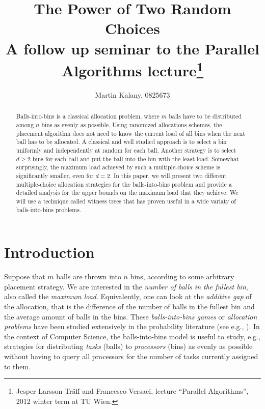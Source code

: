 \documentclass[a4paper,12pt]{article}
\begin{document}
\title{The Power of Two Random Choices\\ 
\large A follow up seminar to the Parallel Algorithms lecture\footnote{Jesper Larsson Tr\"aff and Francesco Versaci, lecture ``Parallel Algorithms'', 2012 winter term at TU Wien.}}
\author{Martin Kalany, 0825673}

\maketitle
\begin{abstract}
Balls-into-bins is a classical allocation problem, where $m$ balls have to be distributed among $n$ bins as evenly as possible. Using ranomized allocations schemes, the placement algorithm does not need to know the current load of all bins when the next ball has to be allocated. A classical and well studied approach is to select a bin uniformly and independently at random for each ball. Another strategy is to select $d\geq 2$ bins for each ball and put the ball into the bin with the least load. Somewhat surprisingly, the maximum load achieved by such a multiple-choice scheme is significantly smaller, even for $d=2$. In this paper, we will present two different multiple-choice allocation strategies for the balls-into-bins problem and provide a detailed analysis for the upper bounds on the maximum load that they achieve. We will use a technique called witness trees that has proven useful in a wide variaty of balls-into-bins problems.
\end{abstract}

\section{Introduction}
\label{sec:intro}
Suppose that $m$ balls are thrown into $n$ bins, according to some arbitrary placement strategy. We are interested in the \emph{number of balls in the fullest bin}, also called the \emph{maximum load}. Equivalently, one can look at the \emph{additive gap} of the allocation, that is the difference of the number of balls in the fullest bin and the average amount of balls in the bins. These \emph{balls-into-bins games} or \emph{allocation problems} have been studied extensively in the probability literature (see e.g., \cite{JK77}). In the context of Computer Science, the balls-into-bins model is useful to study, e.g., strategies for distributing \emph{tasks} (balls) to \emph{processors} (bins) as evenly as possible without having to query all processors for the number of tasks currently assigned to them.
\end{document}
